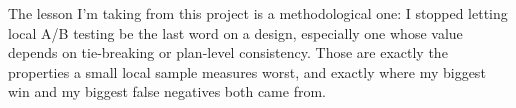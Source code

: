\documentclass[11pt]{article}
\begin{document}
The lesson I'm taking from this project is a methodological one: I stopped letting local A/B testing be the last word on a design, especially one whose value depends on tie-breaking or plan-level consistency. Those are exactly the properties a small local sample measures worst, and exactly where my biggest win and my biggest false negatives both came from.
\end{document}
